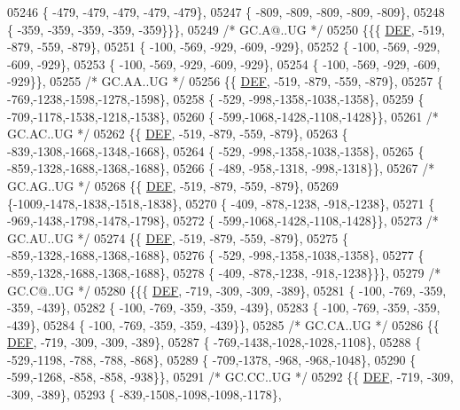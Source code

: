 \begin{DoxyCode}
05246 \{ -479, -479, -479, -479, -479\},
05247 \{ -809, -809, -809, -809, -809\},
05248 \{ -359, -359, -359, -359, -359\}\}\},
05249 \textcolor{comment}{/* GC.A@..UG */}
05250 \{\{\{  \mbox{\hyperlink{1_88_84__epars_8h_a397419fc12b37ed479c8abb9d444d843}{DEF}}, -519, -879, -559, -879\},
05251 \{ -100, -569, -929, -609, -929\},
05252 \{ -100, -569, -929, -609, -929\},
05253 \{ -100, -569, -929, -609, -929\},
05254 \{ -100, -569, -929, -609, -929\}\},
05255 \textcolor{comment}{/* GC.AA..UG */}
05256 \{\{  \mbox{\hyperlink{1_88_84__epars_8h_a397419fc12b37ed479c8abb9d444d843}{DEF}}, -519, -879, -559, -879\},
05257 \{ -769,-1238,-1598,-1278,-1598\},
05258 \{ -529, -998,-1358,-1038,-1358\},
05259 \{ -709,-1178,-1538,-1218,-1538\},
05260 \{ -599,-1068,-1428,-1108,-1428\}\},
05261 \textcolor{comment}{/* GC.AC..UG */}
05262 \{\{  \mbox{\hyperlink{1_88_84__epars_8h_a397419fc12b37ed479c8abb9d444d843}{DEF}}, -519, -879, -559, -879\},
05263 \{ -839,-1308,-1668,-1348,-1668\},
05264 \{ -529, -998,-1358,-1038,-1358\},
05265 \{ -859,-1328,-1688,-1368,-1688\},
05266 \{ -489, -958,-1318, -998,-1318\}\},
05267 \textcolor{comment}{/* GC.AG..UG */}
05268 \{\{  \mbox{\hyperlink{1_88_84__epars_8h_a397419fc12b37ed479c8abb9d444d843}{DEF}}, -519, -879, -559, -879\},
05269 \{-1009,-1478,-1838,-1518,-1838\},
05270 \{ -409, -878,-1238, -918,-1238\},
05271 \{ -969,-1438,-1798,-1478,-1798\},
05272 \{ -599,-1068,-1428,-1108,-1428\}\},
05273 \textcolor{comment}{/* GC.AU..UG */}
05274 \{\{  \mbox{\hyperlink{1_88_84__epars_8h_a397419fc12b37ed479c8abb9d444d843}{DEF}}, -519, -879, -559, -879\},
05275 \{ -859,-1328,-1688,-1368,-1688\},
05276 \{ -529, -998,-1358,-1038,-1358\},
05277 \{ -859,-1328,-1688,-1368,-1688\},
05278 \{ -409, -878,-1238, -918,-1238\}\}\},
05279 \textcolor{comment}{/* GC.C@..UG */}
05280 \{\{\{  \mbox{\hyperlink{1_88_84__epars_8h_a397419fc12b37ed479c8abb9d444d843}{DEF}}, -719, -309, -309, -389\},
05281 \{ -100, -769, -359, -359, -439\},
05282 \{ -100, -769, -359, -359, -439\},
05283 \{ -100, -769, -359, -359, -439\},
05284 \{ -100, -769, -359, -359, -439\}\},
05285 \textcolor{comment}{/* GC.CA..UG */}
05286 \{\{  \mbox{\hyperlink{1_88_84__epars_8h_a397419fc12b37ed479c8abb9d444d843}{DEF}}, -719, -309, -309, -389\},
05287 \{ -769,-1438,-1028,-1028,-1108\},
05288 \{ -529,-1198, -788, -788, -868\},
05289 \{ -709,-1378, -968, -968,-1048\},
05290 \{ -599,-1268, -858, -858, -938\}\},
05291 \textcolor{comment}{/* GC.CC..UG */}
05292 \{\{  \mbox{\hyperlink{1_88_84__epars_8h_a397419fc12b37ed479c8abb9d444d843}{DEF}}, -719, -309, -309, -389\},
05293 \{ -839,-1508,-1098,-1098,-1178\},

\end{DoxyCode}
